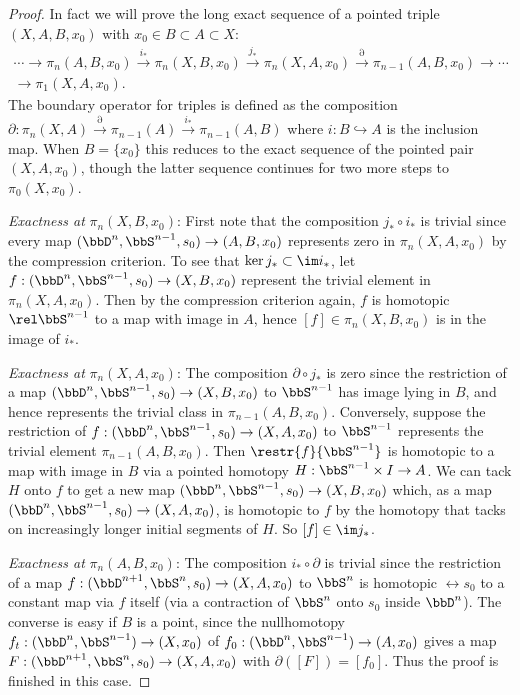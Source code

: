 \begin{proof}
    In fact we will prove the long exact sequence of a pointed triple $(X,A,B,x_0)$ with $x_0\in B\subset A\subset X$:
    \begin{multline}
        \cdots \to \pi_n(A,B,x_0)\overset{i_\ast}{\to}\pi_n(X,B,x_0)\overset{j_\ast}{\to}\pi_n(X,A,x_0)\overset{\partial}{\to}\pi_{n-1}(A,B,x_0)\to \cdots \\ \to \pi_1(X,A,x_0).
    \end{multline}
    The boundary operator for triples is defined as the composition $\partial:\pi_n(X,A)\overset{\partial}{\to} \pi_{n-1}(A)\overset{i_\ast}{\to} \pi_{n-1}(A,B)$ where $i:B\hookrightarrow A$ is the inclusion map. When $B=\{x_0\}$ this reduces to the exact sequence of the pointed pair $(X,A,x_0)$, though the latter sequence continues for two more steps to $\pi_0(X,x_0)$.

    \emph{Exactness at} $\pi_n(X,B,x_0)$: First note that the composition $j_\ast\circ i_\ast$ is trivial since every map $(\bbD^n,\bbS^{n-1},s_0)\to (A,B,x_0)$ represents zero in $\pi_n(X,A,x_0)$ by the compression criterion. To see that $\ker j_\ast \subset \im i_\ast$, let $f:(\bbD^n,\bbS^{n-1},s_0)\to (X,B,x_0)$ represent the trivial element in $\pi_n(X,A,x_0)$. Then by the compression criterion again, $f$ is homotopic $\rel \bbS^{n-1}$ to a map with image in $A$, hence $[f]\in \pi_n(X,B,x_0)$ is in the image of $i_\ast$.

    \emph{Exactness at} $\pi_n(X,A,x_0)$: The composition $\partial\circ j_\ast$ is zero since the restriction of a map $(\bbD^n,\bbS^{n-1},s_0)\to (X,B,x_0)$ to $\bbS^{n-1}$ has image lying in $B$, and hence represents the trivial class in $\pi_{n-1}(A,B,x_0)$. Conversely, suppose the restriction of $f:(\bbD^n,\bbS^{n-1},s_0)\to (X,A,x_0)$ to $\bbS^{n-1}$ represents the trivial element $\pi_{n-1}(A,B,x_0)$. Then $\restr{f}{\bbS^{n-1}}$ is homotopic to a map with image in $B$ via a pointed homotopy $H:\bbS^{n-1}\times I \to A$. We can tack $H$ onto $f$ to get a new map $(\bbD^n,\bbS^{n-1},s_0)\to (X,B,x_0)$ which, as a map $(\bbD^n,\bbS^{n-1},s_0)\to (X,A,x_0)$, is homotopic to $f$ by the homotopy that tacks on increasingly longer initial segments of $H$. So $[f]\in \im j_\ast$.

    \emph{Exactness at} $\pi_n(A,B,x_0)$: The composition $i_\ast \circ \partial$ is trivial since the restriction of a map $f:(\bbD^{n+1},\bbS^n,s_0)\to (X,A,x_0)$ to $\bbS^n$ is homotopic $\rel s_0$ to a constant map via $f$ itself (via a contraction of $\bbS^n$ onto $s_0$ inside $\bbD^n$). The converse is easy if $B$ is a point, since the nullhomotopy $f_t:(\bbD^n,\bbS^{n-1})\to (X,x_0)$ of $f_0:(\bbD^n,\bbS^{n-1})\to (A,x_0)$ gives a map $F:(\bbD^{n+1},\bbS^n,s_0)\to (X,A,x_0)$ with $\partial([F])=[f_0]$. Thus the proof is finished in this case. 
    

\end{proof}
